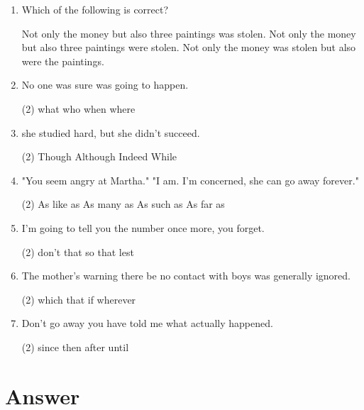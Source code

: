 \begin{enumerate}
\item Which of the following is correct?
\begin{tasks}
  \task Not only the money but also three paintings was stolen.
  \task Not only the money but also three paintings were stolen.
  \task Not only the money was stolen but also were the paintings.
\end{tasks}

\item No one was sure \ttu was going to happen.
\begin{tasks}(2)
  \task what
  \task who
  \task when
  \task where
\end{tasks}

\item \ttu she studied hard, but she didn't succeed.
\begin{tasks}(2)
  \task Though
  \task Although
  \task Indeed
  \task While
\end{tasks}

\item "You seem angry at Martha." "I am. \ttu I'm concerned, she can go away forever."
\begin{tasks}(2)
  \task As like as
  \task As many as
  \task As such as
  \task As far as
\end{tasks}

\item I'm going to tell you the number once more, \ttu you forget.
\begin{tasks}(2)
  \task don't
  \task that
  \task so that
  \task lest
\end{tasks}

\item The mother's warning \ttu there be no contact with boys was generally ignored.
\begin{tasks}(2)
  \task which
  \task that
  \task if
  \task wherever
\end{tasks}

\item Don't go away \ttu you have told me what actually happened.
\begin{tasks}(2)
  \task since
  \task then
  \task after
  \task until
\end{tasks}

\end{enumerate}

\section{Answer}

